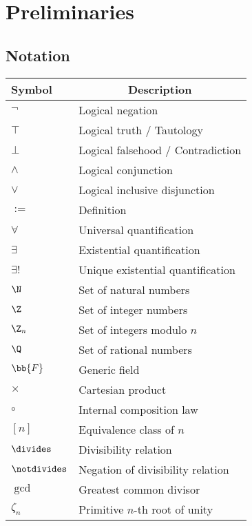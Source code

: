 \chapter{Preliminaries}

\section{Notation}

\begin{tabular}{>{\centering}m{1.8cm} m{5.8cm}}
\toprule
\textbf{Symbol} & \multicolumn{1}{c}{\textbf{Description}} \\
\midrule
$\lnot$ & Logical negation \\
$\top$  & Logical truth / Tautology \\
$\bot$  & Logical falsehood / Contradiction \\
$\land$ & Logical conjunction \\
$\lor$ & Logical inclusive disjunction \\
$:=$   & Definition \\
$\forall$ & Universal quantification \\
$\exists$ & Existential quantification \\
$\exists!$ & Unique existential quantification \\
$\N$ & Set of natural numbers \\
$\Z$ & Set of integer numbers \\
$\Z_n$ & Set of integers modulo $n$ \\
$\Q$ & Set of rational numbers \\
$\bb{F}$ & Generic field \\
$\times$ & Cartesian product \\
$\circ$ & Internal composition law \\
$[n]$ & Equivalence class of $n$ \\
$\divides$ & Divisibility relation \\
$\notdivides$ & Negation of divisibility relation \\
$\gcd$ & Greatest common divisor \\
$\zeta_n$ & Primitive $n$-th root of unity \\
\bottomrule
\end{tabular}

\newpage

